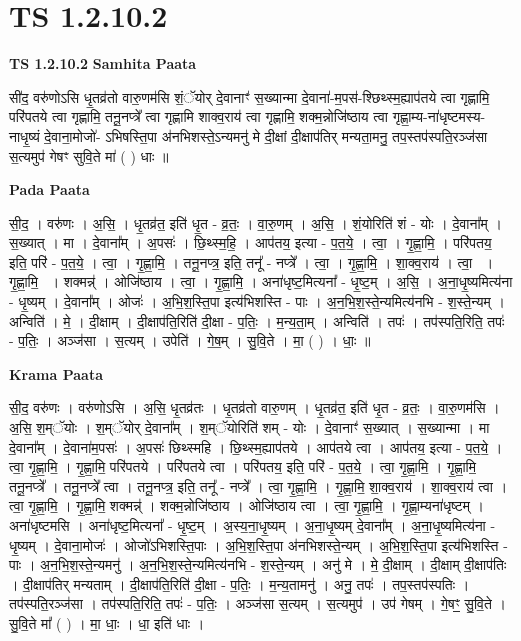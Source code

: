 \documentclass[17pt]{extarticle}
\begin{document}
\section{ TS 1.2.10.2 }

\textbf{TS 1.2.10.2 } \newline
\textbf{Samhita Paata} \newline

सी॑द॒ वरु॑णोऽसि धृ॒तव्र॑तो वारु॒णम॑सि शं॒ॅयोर् दे॒वानाꣳ॑ स॒ख्यान्मा दे॒वाना॑-म॒पस॑-श्छिथ्स्म॒ह्याप॑तये त्वा गृह्णामि॒ परि॑पतये त्वा गृह्णामि॒ तनू॒नप्त्रे᳚ त्वा गृह्णामि शाक्व॒राय॑ त्वा गृह्णामि॒ शक्म॒न्नोजि॑ष्ठाय त्वा गृह्णा॒म्य-ना॑धृष्टमस्य-नाधृ॒ष्यं दे॒वाना॒मोजो॑- ऽभिषस्ति॒पा अ॑नभिशस्ते॒ऽन्यमनु॑ मे दी॒क्षां दी॒क्षाप॑तिर् मन्यता॒मनु॒ तप॒स्तप॑स्पति॒रञ्ज॑सा स॒त्यमुप॑ गेषꣳ सुवि॒ते मा॑ ( ) धाः ॥ \newline

\textbf{Pada Paata} \newline

सी॒द॒ । वरु॑णः । अ॒सि॒ । धृ॒तव्र॑त॒ इति॑ धृ॒त - व्र॒तः॒ । वा॒रु॒णम् । अ॒सि॒ । शं॒योरिति॑ शं - योः । दे॒वाना᳚म् । स॒ख्यात् । मा । दे॒वाना᳚म् । अ॒पसः॑ । छि॒थ्स्म॒हि॒ । आप॑तय॒ इत्या - प॒त॒ये॒ । त्वा॒ ।  गृ॒ह्णा॒मि॒ । परि॑पतय॒ इति॒ परि॑ - प॒त॒ये॒ । त्वा॒ । गृ॒ह्णा॒मि॒ । तनू॒नप्त्र॒ इति॒ तनू᳚ - नप्त्रे᳚ । त्वा॒ । गृ॒ह्णा॒मि॒ । शा॒क्व॒राय॑ । त्वा॒  । गृ॒ह्णा॒मि॒  । शक्मन्न्॑ । ओजि॑ष्ठाय । त्वा॒ । गृ॒ह्णा॒मि॒ । अना॑धृष्ट॒मित्यना᳚ - धृ॒ष्ट॒म् । अ॒सि॒ । अ॒ना॒धृ॒ष्यमित्य॑ना - धृ॒ष्यम् । दे॒वाना᳚म् । ओजः॑ । अ॒भि॒श॒स्ति॒पा इत्य॑भिशस्ति - पाः । अ॒न॒भि॒श॒स्ते॒न्यमित्य॑नभि - श॒स्ते॒न्यम् । अन्विति॑ । मे॒ । दी॒क्षाम् । दी॒क्षाप॑ति॒रिति॑ दी॒क्षा - प॒तिः॒ । म॒न्य॒ता॒म् । अन्विति॑ । तपः॑ । तप॑स्पति॒रिति॒ तपः॑ - प॒तिः॒ । अञ्ज॑सा । स॒त्यम् । उपेति॑ । गे॒ष॒म् । सु॒वि॒ते । मा॒ ( ) । धाः॒ ॥  \newline


\textbf{Krama Paata} \newline

सी॒द॒ वरु॑णः । वरु॑णोऽसि । अ॒सि॒ धृ॒तव्र॑तः । धृ॒तव्र॑तो वारु॒णम् । धृ॒तव्र॑त॒ इति॑ धृ॒त - व्र॒तः॒ । वा॒रु॒णम॑सि । अ॒सि॒ श॒म्ॅयोः । श॒म्ॅयोर् दे॒वाना᳚म् । श॒म्ॅयोरिति॑ शम् - योः । दे॒वानाꣳ॑ स॒ख्यात् । स॒ख्यान्मा । मा दे॒वाना᳚म् । दे॒वाना॑म॒पसः॑ । अ॒पसः॑ छिथ्स्महि । छि॒थ्स्म॒ह्याप॑तये । आप॑तये त्वा । आप॑तय॒ इत्या - प॒त॒ये॒ । त्वा॒ गृ॒ह्णा॒मि॒ । गृ॒ह्णा॒मि॒ परि॑पतये । परि॑पतये त्वा । परि॑पतय॒ इति॒ परि॑ - प॒त॒ये॒ । त्वा॒ गृ॒ह्णा॒मि॒ । गृ॒ह्णा॒मि॒ तनू॒नप्त्रे᳚ । तनू॒नप्त्रे᳚ त्वा । तनू॒नप्त्र॒ इति॒ तनू᳚ - नप्त्रे᳚ । त्वा॒ गृ॒ह्णा॒मि॒ । गृ॒ह्णा॒मि॒ शा॒क्व॒राय॑ । शा॒क्व॒राय॑ त्वा । त्वा॒ गृ॒ह्णा॒मि॒ । गृ॒ह्णा॒मि॒ शक्मन्न्॑ । शक्म॒न्नोजि॑ष्ठाय । ओजि॑ष्ठाय त्वा । त्वा॒ गृ॒ह्णा॒मि॒ । गृ॒ह्णा॒म्यना॑धृष्टम् । अना॑धृष्टमसि । अना॑धृष्ट॒मित्यना᳚ - धृ॒ष्ट॒म् । अ॒स्य॒ना॒धृ॒ष्यम् । अ॒ना॒धृ॒ष्यम् दे॒वाना᳚म् । अ॒ना॒धृ॒ष्यमित्य॑ना - धृ॒ष्यम् । दे॒वाना॒मोजः॑ । ओजो॑ऽभिशस्ति॒पाः । अ॒भि॒श॒स्ति॒पा अ॑नभिशस्ते॒न्यम् । अ॒भि॒श॒स्ति॒पा इत्य॑भिशस्ति - पाः । अ॒न॒भि॒श॒स्ते॒न्यमनु॑ । अ॒न॒भि॒श॒स्ते॒न्यमित्य॑नभि - श॒स्ते॒न्यम् । अनु॑ मे । मे॒ दी॒क्षाम् । दी॒क्षाम् दी॒क्षाप॑तिः । दी॒क्षाप॑तिर् मन्यताम् । दी॒क्षाप॑ति॒रिति॑ दी॒क्षा - प॒तिः॒ । म॒न्य॒तामनु॑ । अनु॒ तपः॑ । तप॒स्तप॑स्पतिः । तप॑स्पति॒रञ्ज॑सा । तप॑स्पति॒रिति॒ तपः॑ - प॒तिः॒ । अञ्ज॑सा स॒त्यम् । स॒त्यमुप॑ । उप॑ गेषम् । गे॒षꣳ॒॒ सु॒वि॒ते । सु॒वि॒ते मा᳚ ( ) । मा॒ धाः॒ । धा॒ इति॑ धाः । \newline
\end{document}
